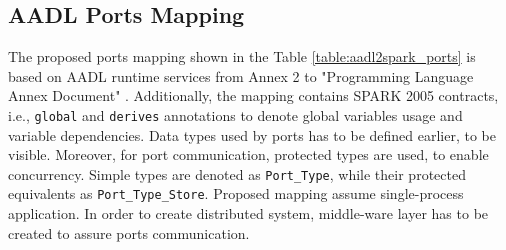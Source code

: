 \subsection{AADL Ports Mapping}
\label{codegen:mapping:ports}

The proposed ports mapping shown in the Table \ref{table:aadl2spark_ports} is based on AADL runtime services from Annex 2 to "Programming Language Annex Document" \cite{AnnexDoc}. Additionally, the mapping contains SPARK 2005 contracts, i.e., \lstinline{global} and \lstinline{derives} annotations to denote global variables usage and variable dependencies. Data types used by ports has to be defined earlier, to be visible. Moreover, for port communication, protected types are used, to enable concurrency. Simple types are denoted as \lstinline{Port_Type}, while their protected equivalents as \lstinline{Port_Type_Store}. Proposed mapping assume single-process application. In order to create distributed system, middle-ware layer has to be created to assure ports communication.

